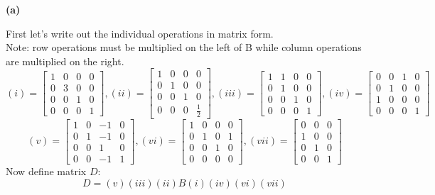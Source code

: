 \documentclass[11pt]{article}
\begin{document}
\textbf{(a)}

\bigskip

First let's write out the individual operations in matrix form.\\
Note: row operations must be multiplied on the left of B while column operations are multiplied on the right.
$$
(i)=\begin{bmatrix}
    1 & 0&0&0\\
    0&3&0&0\\
    0&0&1&0\\
    0&0&0&1
\end{bmatrix},
(ii) = \begin{bmatrix}
1&0&0&0\\
0&1&0&0\\
0&0&1&0\\
0&0&0&\frac12
\end{bmatrix},
(iii)=\begin{bmatrix}
1&1&0&0\\
0&1&0&0\\
0&0&1&0\\
0&0&0&1
\end{bmatrix},
(iv)=\begin{bmatrix}
0&0&1&0\\
0&1&0&0\\
1&0&0&0\\
0&0&0&1
\end{bmatrix}
$$
$$
(v)=\begin{bmatrix}
1&0&-1&0\\
0&1&-1&0\\
0&0&1&0\\
0&0&-1&1
\end{bmatrix},
(vi)=\begin{bmatrix}
1&0&0&0\\
0&1&0&1\\
0&0&1&0\\
0&0&0&0
\end{bmatrix},
(vii)=\begin{bmatrix}
0&0&0\\
1&0&0\\
0&1&0\\
0&0&1
\end{bmatrix}
$$
Now define matrix $D$:
$$
D=(v)(iii)(ii)B(i)(iv)(vi)(vii)
$$
\end{document}
